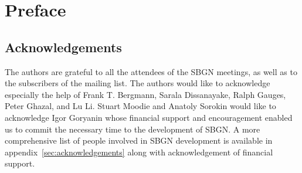 \chapter{Preface}

\section*{Acknowledgements}

The authors are grateful to all the attendees of the SBGN meetings, as well as to the subscribers of the  mailing list.
The authors would like to acknowledge especially the help of Frank T. Bergmann, Sarala Dissanayake, Ralph Gauges, Peter Ghazal, and Lu Li.
Stuart Moodie and Anatoly Sorokin would like to acknowledge Igor Goryanin whose financial support and encouragement enabled us to commit the necessary time to the development of SBGN.
A more comprehensive list of people involved in SBGN development is available in appendix~\ref{sec:acknowledgements} along with acknowledgement of financial support.
